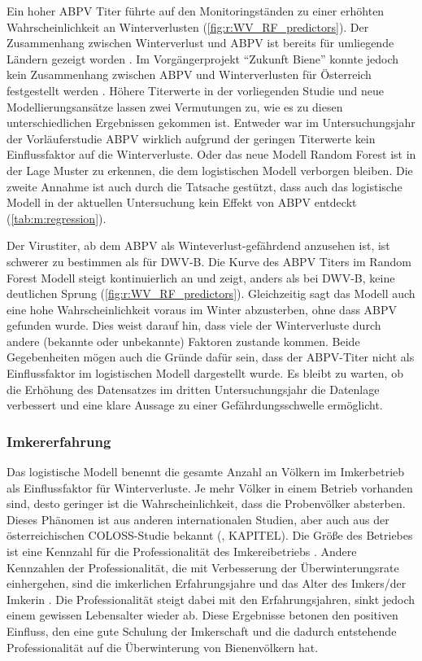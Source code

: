 Ein hoher ABPV Titer führte auf den Monitoringständen zu einer erhöhten Wahrscheinlichkeit an Winterverlusten (\cref{fig:r:WV_RF_predictors}). Der Zusammenhang zwischen Winterverlust und ABPV ist bereits für umliegende Ländern gezeigt worden \citep{genersch2010,berthoud2010}. Im Vorgängerprojekt \enquote{Zukunft Biene} konnte jedoch kein Zusammenhang zwischen ABPV und Winterverlusten für Österreich festgestellt werden \citep{morawetz2018}. Höhere Titerwerte in der vorliegenden Studie und neue Modellierungsansätze lassen zwei Vermutungen zu, wie es zu diesen unterschiedlichen Ergebnissen gekommen ist. Entweder war im Untersuchungsjahr der Vorläuferstudie ABPV wirklich aufgrund der geringen Titerwerte kein Einflussfaktor auf die Winterverluste. Oder das neue Modell Random Forest ist in der Lage Muster zu erkennen, die dem logistischen Modell verborgen bleiben. Die zweite Annahme ist auch durch die Tatsache gestützt, dass auch das logistische Modell in der aktuellen Untersuchung kein Effekt von ABPV entdeckt (\cref{tab:m:regression}).

Der Virustiter, ab dem ABPV als Winteverlust-gefährdend anzusehen ist, ist schwerer zu bestimmen als für DWV-B. Die Kurve des ABPV Titers im Random Forest Modell  steigt kontinuierlich an und zeigt, anders als bei DWV-B, keine deutlichen Sprung (\cref{fig:r:WV_RF_predictors}). Gleichzeitig sagt das Modell auch eine hohe Wahrscheinlichkeit voraus im Winter abzusterben, ohne dass ABPV gefunden wurde. Dies weist darauf hin, dass viele der Winterverluste durch andere (bekannte oder unbekannte) Faktoren zustande kommen. Beide Gegebenheiten mögen auch die Gründe dafür sein, dass der ABPV-Titer nicht als Einflussfaktor im logistischen Modell dargestellt wurde. Es bleibt zu warten, ob die Erhöhung des Datensatzes im dritten Untersuchungsjahr die Datenlage verbessert und eine klare Aussage zu einer Gefährdungsschwelle ermöglicht.

\subsubsection{Imkererfahrung}

Das logistische Modell benennt die gesamte Anzahl an Völkern im Imkerbetrieb als Einflussfaktor für Winterverluste. Je mehr Völker in einem Betrieb vorhanden sind, desto geringer ist die Wahrscheinlichkeit, dass die Probenvölker absterben. Dieses Phänomen ist aus anderen internationalen Studien, aber auch aus der österreichischen COLOSS-Studie bekannt (\cite{brodschneider2016,lee2015,jacques2017,oberreiter2020,vanderzee2014}, KAPITEL). Die Größe des Betriebes ist eine Kennzahl für die Professionalität des Imkereibetriebs \citep{jacques2017}. Andere Kennzahlen der Professionalität, die mit Verbesserung der Überwinterungsrate einhergehen, sind die imkerlichen Erfahrungsjahre und das Alter des Imkers/der Imkerin \citep{jacques2017,morawetz2019}. Die Professionalität steigt dabei mit den Erfahrungsjahren, sinkt jedoch einem gewissen Lebensalter wieder ab. Diese Ergebnisse betonen den positiven Einfluss, den eine gute Schulung der Imkerschaft und die dadurch entstehende Professionalität auf die Überwinterung von Bienenvölkern hat.

